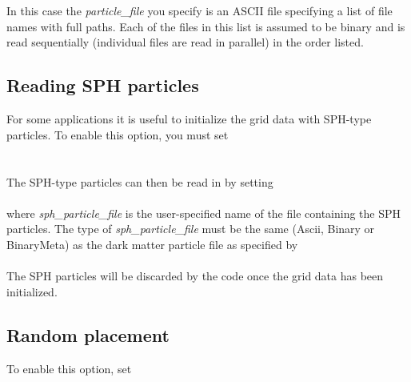  \\
 \\

In this case the {\em particle\_file} you specify is an ASCII file specifying a
list of file names with full paths.   Each of the files in this list is assumed
to be binary and is read sequentially (individual files are read in parallel) in 
the order listed.

\subsection{Reading SPH particles}

For some applications it is useful to initialize the grid data with SPH-type
particles.   To enable this option, you must set \\

 \\
 \\

\noindent The SPH-type particles can then be read in by setting \\

 \\

\noindent where {\em sph\_particle\_file} is the user-specified name of the file
containing the SPH particles.  The type of {\em sph\_particle\_file} 
must be the same (Ascii, Binary or BinaryMeta) as the dark matter particle 
file as specified by   \\

 \\

\noindent The SPH particles will be discarded by the code once the grid data has been initialized.

\subsection{Random placement}

To enable this option, set \\

 \\

